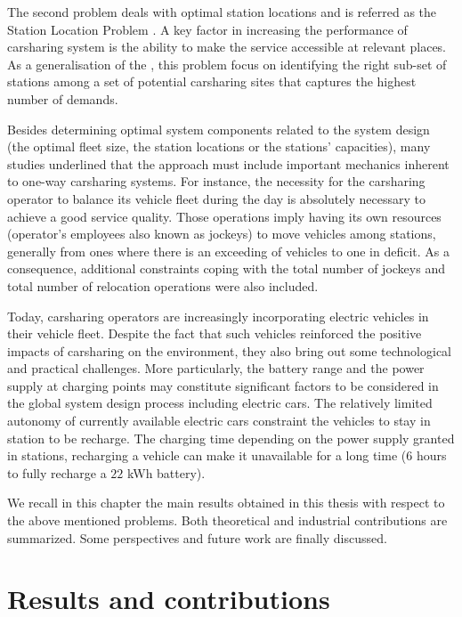 The second problem deals with optimal station locations and is referred as the Station Location Problem {\SLP}.
A key factor in increasing the performance of carsharing system is the ability to make the service accessible at relevant places.
As a generalisation of the {\SDP}, this problem focus on identifying the right sub-set of stations among a set of potential carsharing sites that captures the highest number of demands.


\medskip
Besides determining optimal system components related to the system design (\eg the optimal fleet size, the station locations or the stations' capacities), many studies underlined that the approach must include important mechanics inherent to one-way carsharing systems.
For instance, the necessity for the carsharing operator to balance its vehicle fleet during the day is absolutely necessary to achieve a good service quality.
Those operations imply having its own resources (operator's employees also known as jockeys) to move vehicles among stations, generally from ones where there is an exceeding of vehicles to one in deficit.
As a consequence, additional constraints coping with the total number of jockeys and total number of relocation operations were also included.


\medskip
Today, carsharing operators are increasingly incorporating electric vehicles in their vehicle fleet. 
Despite the fact that such vehicles reinforced the positive impacts of carsharing on the environment, they also bring out some technological and practical challenges.
More particularly, the battery range and the power supply at charging points may constitute significant factors to be considered in the global system design process including electric cars.
The relatively limited autonomy of currently available electric cars constraint the vehicles to stay in station to be recharge.
The charging time depending on the power supply granted in stations, recharging a vehicle can make it unavailable for a long time ($6$ hours to fully recharge a $22$ kWh battery).


\bigskip
We recall in this chapter the main results obtained in this thesis with respect to the above mentioned problems.
Both theoretical and industrial contributions are summarized.
Some perspectives and future work are finally discussed.


\newpage
\section{Results and contributions}
